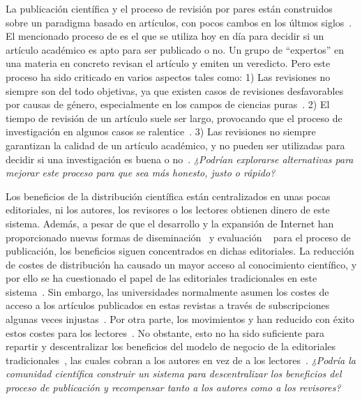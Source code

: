 La publicación científica y el proceso de revisión por pares están construidos
sobre un paradigma basado en artículos, con pocos cambos en los últmos
siglos~\cite{spier2002history}. El mencionado proceso de 
es el que se utiliza hoy en día para decidir si un artículo académico es
apto para ser publicado o no. Un grupo de ``expertos'' en una materia en
concreto revisan el artículo y emiten un veredicto.
Pero este proceso ha sido criticado en varios aspectos tales como: 1) Las revisiones no
siempre son del todo objetivas, ya que existen casos de revisiones desfavorables
por causas de género, especialmente en los campos de ciencias
puras~\cite{wenneras2001nepotism}. 2) El tiempo de revisión de un artículo suele
ser largo, provocando que el proceso de investigación en algunos casos se
ralentice~\cite{huisman2017duration}. 3) Las revisiones no siempre garantizan la
calidad de un artículo académico, y no pueden ser utilizadas para decidir si una
investigación es buena o no~\cite{goldbeck1999evidence}. \emph{¿Podrían
  explorarse alternativas para mejorar este proceso para que sea más honesto,
  justo o rápido?}

Los beneficios de la distribución científica están centralizados en unas pocas
editoriales, ni los autores, los revisores o los lectores obtienen dinero de
este sistema. Además, a pesar de que el desarrollo y la expansión de Internet
han proporcionado nuevas formas de diseminación~\cite{eysenbach2006citation} y
evaluación ~\cite{walker_emerging_2015} para el proceso de publicación, los
beneficios siguen concentrados en dichas editoriales. La reducción de costes de
distribución ha causado un mayor acceso al conocimiento científico, y por ello
se ha cuestionado el papel de las editoriales tradicionales en este
sistema~\cite{ReinventingRigor}. Sin embargo, las universidades normalmente
asumen los costes de acceso a los artículos publicados en estas revistas a
través de subscripciones algunas veces injustas~\cite{bergstrom2004costs}. Por otra parte, los
movimientos  y  han reducido con éxito estos
costes para los lectores~\cite{evans2009open}. No obstante, esto no ha sido
suficiente para repartir y descentralizar los beneficios del modelo de negocio de la editoriales
tradicionales~\cite{lariviere2015oligopoly}, las cuales cobran a los autores en
vez de a los lectores~\cite{van2013true}. \emph{¿Podría la comunidad científica
  construir un sistema para descentralizar los beneficios del proceso de
  publicación y recompensar tanto a los autores como a los revisores?}

